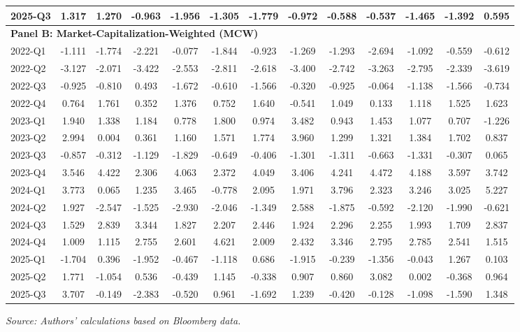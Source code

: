 \documentclass[12pt]{article}
\begin{document}
\begin{table}[htbp]
\begin{adjustbox}{max width=\textwidth}
\begin{tabular}{lcccccccccccc}
2025-Q3 & 1.317 & 1.270 & -0.963 & -1.956 & -1.305 & -1.779 & -0.972 & -0.588 & -0.537 & -1.465 & -1.392 & 0.595 \\
\midrule
\multicolumn{13}{l}{\textbf{Panel B: Market-Capitalization-Weighted (MCW)}} \\
\midrule
2022-Q1 & -1.111 & -1.774 & -2.221 & -0.077 & -1.844 & -0.923 & -1.269 & -1.293 & -2.694 & -1.092 & -0.559 & -0.612 \\
2022-Q2 & -3.127 & -2.071 & -3.422 & -2.553 & -2.811 & -2.618 & -3.400 & -2.742 & -3.263 & -2.795 & -2.339 & -3.619 \\
2022-Q3 & -0.925 & -0.810 & 0.493 & -1.672 & -0.610 & -1.566 & -0.320 & -0.925 & -0.064 & -1.138 & -1.566 & -0.734 \\
2022-Q4 & 0.764 & 1.761 & 0.352 & 1.376 & 0.752 & 1.640 & -0.541 & 1.049 & 0.133 & 1.118 & 1.525 & 1.623 \\
2023-Q1 & 1.940 & 1.338 & 1.184 & 0.778 & 1.800 & 0.974 & 3.482 & 0.943 & 1.453 & 1.077 & 0.707 & -1.226 \\
2023-Q2 & 2.994 & 0.004 & 0.361 & 1.160 & 1.571 & 1.774 & 3.960 & 1.299 & 1.321 & 1.384 & 1.702 & 0.837 \\
2023-Q3 & -0.857 & -0.312 & -1.129 & -1.829 & -0.649 & -0.406 & -1.301 & -1.311 & -0.663 & -1.331 & -0.307 & 0.065 \\
2023-Q4 & 3.546 & 4.422 & 2.306 & 4.063 & 2.372 & 4.049 & 3.406 & 4.241 & 4.472 & 4.188 & 3.597 & 3.742 \\
2024-Q1 & 3.773 & 0.065 & 1.235 & 3.465 & -0.778 & 2.095 & 1.971 & 3.796 & 2.323 & 3.246 & 3.025 & 5.227 \\
2024-Q2 & 1.927 & -2.547 & -1.525 & -2.930 & -2.046 & -1.349 & 2.588 & -1.875 & -0.592 & -2.120 & -1.990 & -0.621 \\
2024-Q3 & 1.529 & 2.839 & 3.344 & 1.827 & 2.207 & 2.446 & 1.924 & 2.296 & 2.255 & 1.993 & 1.709 & 2.837 \\
2024-Q4 & 1.009 & 1.115 & 2.755 & 2.601 & 4.621 & 2.009 & 2.432 & 3.346 & 2.795 & 2.785 & 2.541 & 1.515 \\
2025-Q1 & -1.704 & 0.396 & -1.952 & -0.467 & -1.118 & 0.686 & -1.915 & -0.239 & -1.356 & -0.043 & 1.267 & 0.103 \\
2025-Q2 & 1.771 & -1.054 & 0.536 & -0.439 & 1.145 & -0.338 & 0.907 & 0.860 & 3.082 & 0.002 & -0.368 & 0.964 \\
2025-Q3 & 3.707 & -0.149 & -2.383 & -0.520 & 0.961 & -1.692 & 1.239 & -0.420 & -0.128 & -1.098 & -1.590 & 1.348 \\
\bottomrule
\end{tabular}
\end{adjustbox}
\vspace{2pt}
{\footnotesize \textit{Source: Authors' calculations based on Bloomberg data.}}
\end{table}
\end{document}
